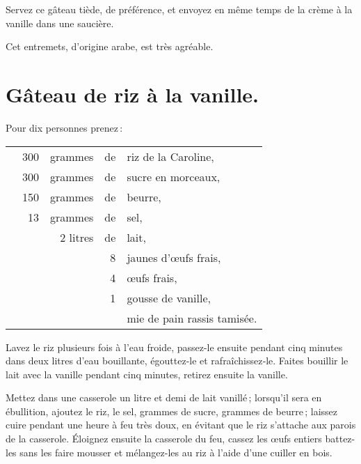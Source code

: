 Servez ce gâteau tiède, de préférence, et envoyez en même temps de la crème
à la vanille dans une saucière.

Cet entremets, d'origine arabe, est très agréable.

\section*{\centering Gâteau de riz à la vanille.}
{}

Pour dix personnes prenez :

\footnotesize
\begin{longtable}{rrrrp{16em}}
  & 300 & grammes & de & riz de la Caroline,                                                              \\
  & 300 & grammes & de & sucre en morceaux,                                                               \\
  & 150 & grammes & de & beurre,                                                                          \\
  &  13 & grammes & de & sel,                                                                             \\
  & \multicolumn{2}{r}{2 litres} & de & lait,                                                             \\
  &     &         &  8 & jaunes d'œufs frais,                                                             \\
  &     &         &  4 & œufs frais,                                                                      \\
  &     &         &  1 & gousse de vanille,                                                               \\
  &     &         &    & mie de pain rassis tamisée.                                                      \\
\end{longtable}
\normalsize

Lavez le riz plusieurs fois à l’eau froide, passez-le ensuite pendant cinq
minutes dans deux litres d'eau bouillante, égouttez‑le et rafraîchissez‑le.
Faites bouillir le lait avec la vanille pendant cinq minutes, retirez ensuite
la vanille.

Mettez dans une casserole un litre et demi de lait vanillé ; lorsqu'il sera en
ébullition, ajoutez le riz, le sel, {\mmm} grammes de sucre,
{\mmm} grammes de beurre ; laissez cuire pendant une heure à feu très
doux, en évitant que le riz s'attache aux parois de la casserole. Éloignez
ensuite la casserole du feu, cassez les œufs entiers battez-les sans les faire
mousser et mélangez-les au riz à l'aide d'une cuiller en bois.


